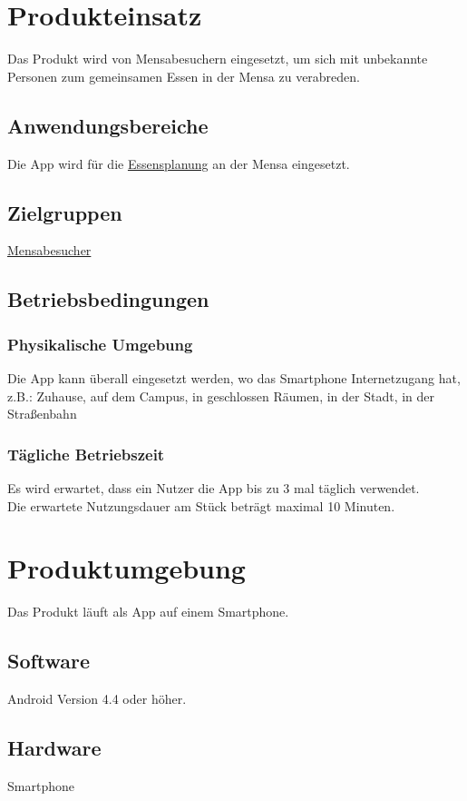 \documentclass[a4paper]{scrreprt}
\begin{document}
\chapter{Produkteinsatz}
Das Produkt wird von Mensabesuchern eingesetzt, um sich mit unbekannte Personen zum gemeinsamen Essen in der Mensa zu verabreden.

 
\section{Anwendungsbereiche}
Die App wird für die \hyperlink{label3}{Essensplanung} an der Mensa eingesetzt.
 
\section{Zielgruppen}
\hyperlink{label1}{Mensabesucher}
 
\section{Betriebsbedingungen}
\subsection{Physikalische Umgebung}
Die App kann überall eingesetzt werden, wo das Smartphone Internetzugang hat,
z.B.: Zuhause, auf dem Campus, in geschlossen Räumen, in der Stadt, in der Straßenbahn

\subsection{Tägliche Betriebszeit}
Es wird erwartet, dass ein Nutzer die App bis zu 3 mal täglich verwendet. \\
Die erwartete Nutzungsdauer am Stück beträgt maximal 10 Minuten. 
 
\chapter{Produktumgebung}
Das Produkt läuft als App auf einem Smartphone.

\section{Software}
Android Version 4.4 oder höher.
 
\section{Hardware}
Smartphone 
 
\end{document}

